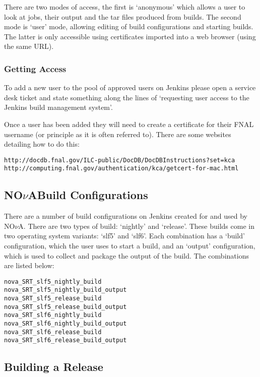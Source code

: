 \documentclass[letterpaper,10pt]{article}
\newcommand{\nova}{NO$\nu$A}
\newcommand{\novas}{\nova \space}
\begin{document}
There are two modes of access, the first is `anonymous' which allows a user to look at jobs, their output and the tar files produced from builds. The second mode is `user' mode, allowing editing of build configurations and starting builds. The latter is only accessible using certificates imported into a web browser (using the same URL). 

\subsubsection{Getting Access}
To add a new user to the pool of approved users on Jenkins please open a service desk ticket and state something along the lines of `requesting user access to the Jenkins build management system'.

Once a user has been added they will need to create a certificate for their FNAL username (or principle as it is often referred to). There are some websites detailing how to do this:

\begin{verbatim}
http://docdb.fnal.gov/ILC-public/DocDB/DocDBInstructions?set=kca
http://computing.fnal.gov/authentication/kca/getcert-for-mac.html
\end{verbatim}

\subsection{\novas Build Configurations}

There are a number of build configurations on Jenkins created for and used by \novas. There are two types of build: `nightly' and `release'. These builds come in two operating system variants: `slf5' and `slf6'. Each combination has a `build' configuration, which the user uses to start a build, and an `output' configuration, which is used to collect and package the output of the build. The combinations are listed below:

\begin{verbatim}
nova_SRT_slf5_nightly_build
nova_SRT_slf5_nightly_build_output
nova_SRT_slf5_release_build
nova_SRT_slf5_release_build_output
nova_SRT_slf6_nightly_build
nova_SRT_slf6_nightly_build_output
nova_SRT_slf6_release_build
nova_SRT_slf6_release_build_output
\end{verbatim}

\subsection{Building a Release}
\end{document}

